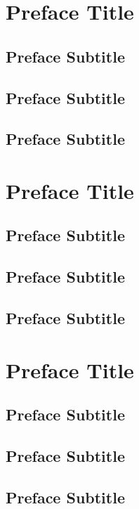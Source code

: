 \section{Preface Title}
\subsection{Preface Subtitle}
\subsection{Preface Subtitle}
\subsection{Preface Subtitle}

\newpage

\section{Preface Title}
\subsection{Preface Subtitle}
\subsection{Preface Subtitle}
\subsection{Preface Subtitle}

\newpage

\section{Preface Title}
\subsection{Preface Subtitle}
\subsection{Preface Subtitle}
\subsection{Preface Subtitle}
